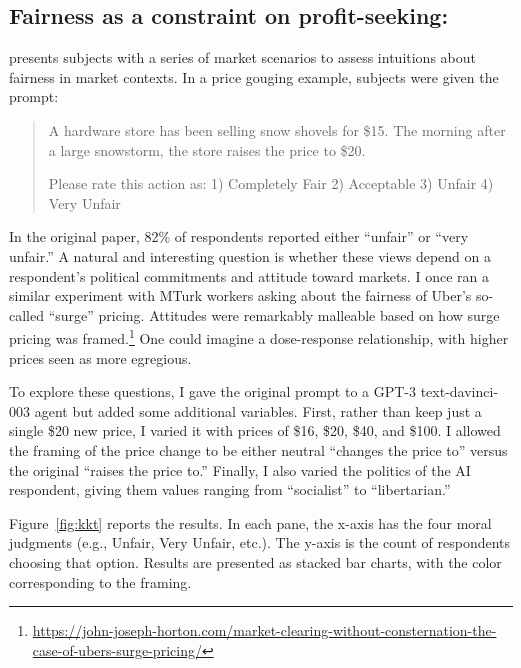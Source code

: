 \documentclass[11pt]{article}
\begin{document}
\subsection{Fairness as a constraint on profit-seeking: \cite{kahneman1986fairness}} \label{sec:kkt}

\cite{kahneman1986fairness} presents subjects with a series of market scenarios to assess intuitions about fairness in market contexts.
In a price gouging example, subjects were given the prompt:
\begin{quote}
A hardware store has been selling snow shovels for \$15. 
The morning after a large snowstorm, the store raises the price to \$20. 

Please rate this action as:
1) Completely Fair  2) Acceptable 3) Unfair  4) Very Unfair
\end{quote}

In the original paper, 82\% of respondents reported either ``unfair''
or ``very unfair.''
A natural and interesting question is whether these views depend on a respondent's political commitments and attitude toward markets. 
I once ran a similar experiment with MTurk workers asking about the fairness of Uber's so-called ``surge'' pricing.
Attitudes were remarkably malleable based on how surge pricing was framed.\footnote{
    \href{https://john-joseph-horton.com/market-clearing-without-consternation-the-case-of-ubers-surge-pricing/}{https://john-joseph-horton.com/market-clearing-without-consternation-the-case-of-ubers-surge-pricing/}
}
One could imagine a dose-response relationship, with higher prices seen as more egregious.

To explore these questions, I gave the original prompt to a GPT-3 text-davinci-003 agent but added some additional variables.
First, rather than keep just a single \$20 new price, I varied it with prices of \$16, \$20, \$40, and \$100.
I allowed the framing of the price change to be either neutral ``changes the price to'' versus the original ``raises the price to.'' 
Finally, I also varied the politics of the AI respondent, giving them values ranging from ``socialist'' to ``libertarian.''

Figure~\ref{fig:kkt} reports the results.
In each pane, the x-axis has the four moral judgments (e.g., Unfair, Very Unfair, etc.).
The y-axis is the count of respondents choosing that option.
Results are presented as stacked bar charts, with the color corresponding to the framing. 
\end{document}
